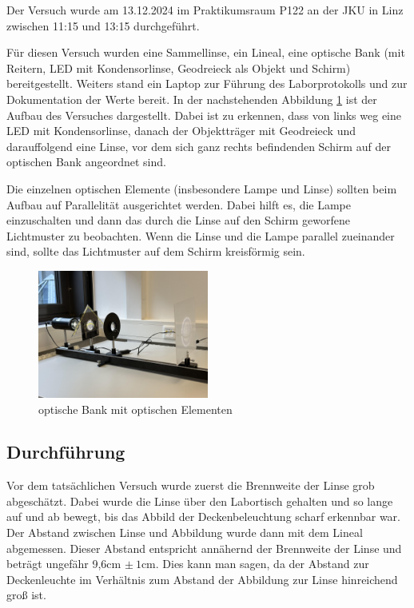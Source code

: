 \documentclass[a4paper,12pt]{article}
\begin{document}
Der Versuch wurde am 13.12.2024 im Praktikumsraum P122 an der JKU in Linz zwischen 11:15 und
13:15 durchgeführt.

Für diesen Versuch wurden eine Sammellinse, ein Lineal, eine optische Bank (mit Reitern, LED
mit Kondensorlinse, Geodreieck als Objekt und Schirm) bereitgestellt.
Weiters stand ein Laptop zur Führung des Laborprotokolls und zur Dokumentation der Werte bereit.
In der nachstehenden Abbildung \ref{Abb:Versuchsaufbau1} ist der Aufbau des Versuches dargestellt.
Dabei ist zu erkennen, dass von links weg eine LED mit Kondensorlinse, danach der Objektträger
mit Geodreieck und darauffolgend eine Linse, vor dem sich ganz rechts befindenden Schirm auf der
optischen Bank angeordnet sind.

Die einzelnen optischen Elemente (insbesondere Lampe und Linse) sollten beim Aufbau auf Parallelität
ausgerichtet werden. Dabei hilft es, die Lampe einzuschalten und dann das durch die Linse auf den
Schirm geworfene Lichtmuster zu beobachten. Wenn die Linse und die Lampe parallel zueinander sind,
sollte das Lichtmuster auf dem Schirm kreisförmig sein.

\begin{figure}[H]
    \centering
    \includegraphics[width=0.5\textwidth]{bilder/Versuchsaufbau1.jpg}           %
    \caption{optische Bank mit optischen Elementen}                             %
    \label{Abb:Versuchsaufbau1}
\end{figure}

\subsection{Durchführung}
\label{sec:Durchfuehrung}

Vor dem tatsächlichen Versuch wurde zuerst die Brennweite der Linse grob abgeschätzt.
Dabei wurde die Linse über den Labortisch gehalten und so lange auf und ab bewegt, bis das
Abbild der Deckenbeleuchtung scharf erkennbar war. Der Abstand zwischen Linse und Abbildung
wurde dann mit dem Lineal abgemessen. Dieser Abstand entspricht annähernd der Brennweite
der Linse und beträgt ungefähr 9,6cm $\pm\:1\mathrm{cm}$. Dies kann man sagen, da der Abstand
zur Deckenleuchte im Verhältnis zum Abstand der Abbildung zur Linse hinreichend groß ist.
\end{document}
